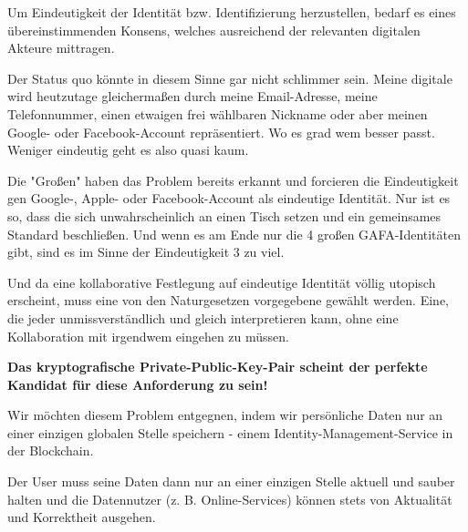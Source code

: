 \vspace{0.3cm}

\begin{Solution}\label{sol1}

Um Eindeutigkeit der Identität bzw. Identifizierung herzustellen, bedarf es eines übereinstimmenden Konsens, welches ausreichend der relevanten digitalen Akteure mittragen.

Der Status quo könnte in diesem Sinne gar nicht schlimmer sein. Meine digitale wird heutzutage gleichermaßen durch meine Email-Adresse, meine Telefonnummer, einen etwaigen frei wählbaren Nickname oder aber meinen Google- oder Facebook-Account repräsentiert. Wo es grad wem besser passt. Weniger eindeutig geht es also quasi kaum.

Die "Großen" haben das Problem bereits erkannt und forcieren die Eindeutigkeit gen Google-, Apple- oder Facebook-Account als eindeutige Identität. Nur ist es so, dass die sich unwahrscheinlich an einen Tisch setzen und ein gemeinsames Standard beschließen. Und wenn es am Ende nur die 4 großen GAFA-Identitäten gibt, sind es im Sinne der Eindeutigkeit 3 zu viel.

\vspace{0.2cm}

Und da eine kollaborative Festlegung auf eindeutige Identität völlig utopisch erscheint, muss eine von den Naturgesetzen vorgegebene gewählt werden. Eine, die jeder unmissverständlich und gleich interpretieren kann, ohne eine Kollaboration mit irgendwem eingehen zu müssen.

\vspace{0.2cm}

\textbf{Das kryptografische Private-Public-Key-Pair scheint der perfekte Kandidat für diese Anforderung zu sein!}

\end{Solution}

\vspace{0.3cm}


\begin{Solution} \label{sol2}

Wir möchten diesem Problem entgegnen, indem wir persönliche Daten nur an einer einzigen globalen Stelle speichern - einem Identity-Management-Service in der \newline Blockchain.

Der User muss seine Daten dann nur an einer einzigen Stelle aktuell und sauber halten und die Datennutzer (z. B. Online-Services) können stets von Aktualität und Korrektheit ausgehen.

\end{Solution}

